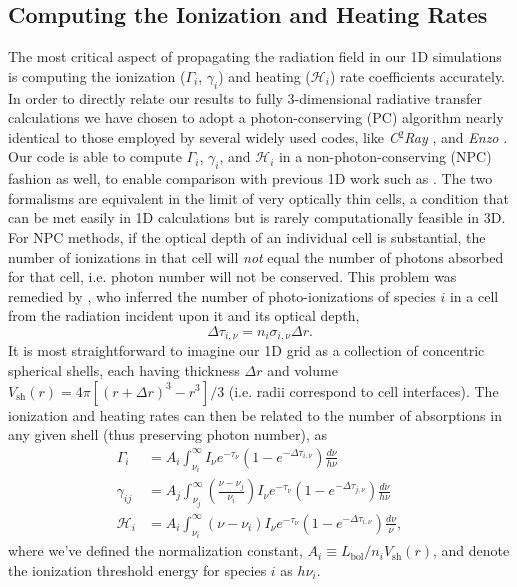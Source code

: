 \documentclass[letterpaper,titlepage,12pt]{article}
\numberwithin{equation}{section}
\newcommand{\Heat}{\mathcal{H}}
\newcommand{\sh}{\mathrm{sh}}
\begin{document}
\subsection{Computing the Ionization and Heating Rates}
The most critical aspect of propagating the radiation field in our 1D
simulations is computing the ionization ($\Gamma_i$, $\gamma_{i}$) and heating
($\Heat_i$) rate coefficients accurately. In order to directly relate our
results to fully 3-dimensional radiative transfer calculations we have chosen
to adopt a photon-conserving (PC) algorithm nearly identical to those employed
by several widely used codes, like \textit{C$^2$Ray} \citep{Mellema2006}, and
\textit{Enzo} \citep{Wise2011}. Our code is able to compute $\Gamma_i$,
$\gamma_{i}$, and $\Heat_i$ in a non-photon-conserving (NPC) fashion as well,
to enable comparison with previous 1D work such as \citet{Thomas2008}. The two
formalisms are equivalent in the limit of very optically thin cells, a
condition that can be met easily in 1D calculations but is rarely
computationally feasible in 3D. For NPC methods, if the optical depth of an
individual cell is substantial, the number of ionizations in that cell will
\textit{not} equal the number of photons absorbed for that cell, i.e. photon
number will not be conserved. This problem was remedied by \citet{Abel1999},
who inferred the number of photo-ionizations of species $i$ in a cell from the
radiation incident upon it and its optical depth,
\begin{equation}
    \Delta \tau_{i,\nu} = n_i \sigma_{i,\nu} \Delta r .
\end{equation}    
It is most straightforward to imagine our 1D grid as a collection of
concentric spherical shells, each having thickness $\Delta r$ and volume
$V_{\sh}(r) = 4 \pi [(r + \Delta r)^3 - r^3] / 3$ (i.e. radii correspond to
cell interfaces). The ionization and heating rates can then be related to the
number of absorptions in any given shell (thus preserving photon number), as
\begin{align}
    \Gamma_i & = A_i \int_{\nu_i}^{\infty} I_{\nu} e^{-\tau_{\nu}} \left(1 - e^{-\Delta \tau_{i,\nu}}\right) \frac{d\nu}{h\nu} \label{eq:PhotoIonizationRate} \\
    \gamma_{ij} & = A_j \int_{\nu_j}^{\infty} \left(\frac{\nu - \nu_j}{\nu_i}\right) I_{\nu} e^{-\tau_{\nu}} \left(1 - e^{-\Delta \tau_{j,\nu}}\right) \frac{d\nu}{h\nu} \label{eq:SecondaryIonizationRate} \\
    \Heat_i & = A_i \int_{\nu_i}^{\infty} (\nu - \nu_i) I_{\nu} e^{-\tau_{\nu}} \left(1 - e^{-\Delta \tau_{i,\nu}}\right) \frac{d\nu}{\nu} , \label{eq:HeatingRate}
\end{align}    
where we've defined the normalization constant, $A_i \equiv
L_{\mathrm{bol}}/n_i V_{\sh}(r)$, and denote the ionization threshold energy
for species $i$ as $h\nu_i$. 
\end{document}
